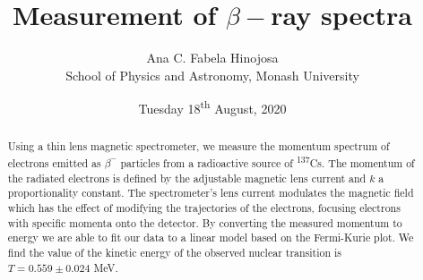 \documentclass[12pt,a4paper]{article}
\title{Measurement of $\beta-$ray spectra}
\author{Ana C. Fabela Hinojosa\\
\small{School of Physics and Astronomy, Monash University}}
\date{Tuesday 18\textsuperscript{th} August, 2020}
\begin{document}
\maketitle
\begin{abstract}
Using a thin lens magnetic spectrometer, we measure the momentum spectrum of electrons emitted as $\beta^{-}$ particles from a radioactive source of  \textsuperscript{137}Cs. 
The momentum of the radiated electrons is defined by the adjustable magnetic lens current and $k$ a proportionality constant. The spectrometer's lens current modulates the magnetic field which has the effect of modifying the trajectories of the electrons, focusing electrons with specific momenta onto the detector. By converting the measured momentum to energy we are able to fit our data to a linear model based on the Fermi-Kurie plot. We find the value of the kinetic energy of the observed nuclear transition is $T = 0.559 \pm 0.024$ MeV.
\end{abstract}
\end{document}
